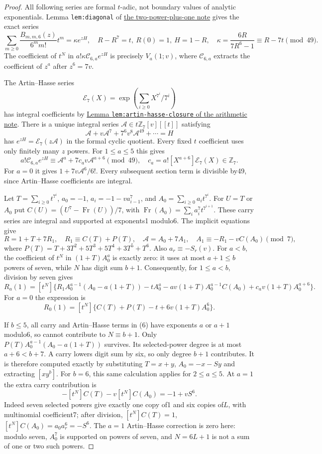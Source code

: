 \documentclass[11pt]{article}
\begin{document}
\begin{proof}
All following series are formal $t$-adic, not boundary values of
analytic exponentials.
Lemma \texttt{lem:diagonal} of
\href{GAP_SIX_TWO_POWER_PLUS_ONE_SFC.tex}{the two-power-plus-one note}
gives the exact series
\[
 \sum_{m\ge0}\frac{B_{m,m,6}(z)}{6^mm!}t^m
 =\kappa e^{zH},\quad
 R-R^7=t,\ R(0)=1,\ H=1-R,\quad
 \kappa=\frac{6R}{7R^6-1}\equiv R-7t\pmod{49}.           \tag{5}
\]
The coefficient of $t^N$ in $a!\kappa\mathcal C_{6,a}e^{zH}$
is precisely $V_a(1;v)$, where $\mathcal C_{6,a}$ extracts the
coefficient of $z^a$ after $z^6=7v$.

The Artin--Hasse series
\[
 \mathcal E_7(X)=\exp\left(\sum_{i\ge0}X^{7^i}/7^i\right)
\]
has integral coefficients by
\href{ARITHMETIC_FRONTIER_TERMINAL_ORDERS.tex}
{Lemma \texttt{lem:artin-hasse-closure} of the arithmetic note}.
There is a unique integral series
$\mathscr A\in t\mathbb Z_7[v][[t]]$ satisfying
\[
 \mathscr A+v\mathscr A^7+7^6v^8\mathscr A^{49}+\cdots=H
\]
has $e^{zH}=\mathcal E_7(z\mathscr A)$ in the formal cyclic quotient.
Every fixed $t$ coefficient uses only finitely many $z$ powers.
For $1\le a\le5$ this gives
\[
 a!\mathcal C_{6,a}e^{zH}
 \equiv\mathscr A^a+7c_av\mathscr A^{a+6}\pmod{49},
 \quad c_a=a![X^{a+6}]\mathcal E_7(X)\in\mathbb Z_7.
\]
For $a=0$ it gives $1+7v\mathscr A^6/6!$.
Every subsequent section term is divisible by49, since
Artin--Hasse coefficients are integral.

Let $T=\sum_{i\ge0}t^{7^i}$, $a_0=-1$,
$a_i=-1-va_{i-1}^7$, and $A_0=\sum_{i\ge0}a_it^{7^i}$.
For $U=T$ or $A_0$ put
$C(U)=(U^7-\operatorname{Fr}(U))/7$, with
$\operatorname{Fr}(A_0)=\sum_i a_i^7t^{7^{i+1}}$.
These carry series are integral and supported at exponents1 modulo6.
The implicit equations give
\[
 R=1+T+7R_1,\quad R_1\equiv C(T)+P(T),\quad
 \mathscr A=A_0+7A_1,\quad A_1\equiv-R_1-vC(A_0)\pmod7,
\]
where $P(T)=T+3T^2+5T^3+5T^4+3T^5+T^6$.
Also $a_r\equiv-S_r(v)$.
For $a<b$, the coefficient of $t^N$ in $(1+T)A_0^a$ is
exactly zero: it uses at most $a+1\le b$ powers of seven, while
$N$ has digit sum $b+1$.
Consequently, for $1\le a<b$, division by seven gives
\[
 R_a(1)=[t^N]\{R_1A_0^{a-1}(A_0-a(1+T))
 -tA_0^a-av(1+T)A_0^{a-1}C(A_0)
 +c_av(1+T)A_0^{a+6}\}.                                \tag{6}
\]
For $a=0$ the expression is
\[
 R_0(1)=[t^N]\{C(T)+P(T)-t+6v(1+T)A_0^6\}.             \tag{7}
\]

If $b\le5$, all carry and Artin--Hasse terms in (6) have exponents
$a$ or $a+1$ modulo6, so cannot contribute to $N\equiv b+1$.
Only $P(T)A_0^{a-1}(A_0-a(1+T))$ survives.
Its selected-power degree is at most $a+6<b+7$.
A carry lowers digit sum by six, so only degree $b+1$ contributes.
It is therefore computed exactly by substituting
$T=x+y$, $A_0=-x-Sy$ and extracting $[xy^b]$.
For $b=6$, this same calculation applies for $2\le a\le5$.
At $a=1$ the extra carry contribution is
\[
 -[t^N]C(T)-v[t^N]C(A_0)=-1+vS^6.
\]
Indeed seven selected powers give exactly one copy of1 and six
copies of$L$, with multinomial coefficient7; after division,
$[t^N]C(T)=1$, $[t^N]C(A_0)=a_0a_r^6=-S^6$.
The $a=1$ Artin--Hasse correction is zero here: modulo seven,
$A_0^7$ is supported on powers of seven, and $N=6L+1$ is not
a sum of one or two such powers.


\end{proof}
\end{document}
